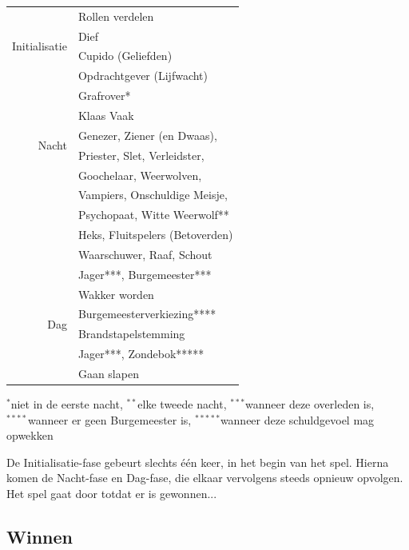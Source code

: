 \documentclass[12pt]{article}
\begin{document}
    \begin{center}
      \begin{tabular}{r|l}
	\multirow{4}{*}{Initialisatie} & Rollen verdelen \\ \cline{2-2}
	 & Dief \\ \cline{2-2}
	 & Cupido (Geliefden) \\ \cline{2-2}
	 & Opdrachtgever (Lijfwacht) \\
	\hline
	\hline
	\multirow{6}{*}{Nacht} & Grafrover* \\ \cline{2-2}
	 & Klaas Vaak \\ \cline{2-2}
	 & Genezer, Ziener (en Dwaas), \\
	 & Priester, Slet, Verleidster, \\
	 & Goochelaar, Weerwolven, \\
	 & Vampiers, Onschuldige Meisje, \\
	 & Psychopaat, Witte Weerwolf** \\ \cline{2-2}
	 & Heks, Fluitspelers (Betoverden)\\ \cline{2-2}
	 & Waarschuwer, Raaf, Schout \\ \cline{2-2}
	 & Jager***, Burgemeester*** \\
	\hline
	\multirow{4}{*}{Dag} & Wakker worden \\ \cline{2-2}
	 & Burgemeesterverkiezing**** \\ \cline{2-2}
	 & Brandstapelstemming \\ \cline{2-2}
	 & Jager***, Zondebok***** \\ \cline{2-2}
	 & Gaan slapen \\
      \end{tabular}
      
      {\scriptsize \noindent $^{\ast}$niet in de eerste nacht, 
      $^{\ast\ast}$elke tweede nacht, 
      $^{\ast\ast\ast}$wanneer deze overleden is, \\
      $^{\ast\ast\ast\ast}$wanneer er geen Burgemeester is,
      $^{\ast\ast\ast\ast\ast}$wanneer deze schuldgevoel mag opwekken}
      
    \end{center}
    
    De Initialisatie-fase gebeurt slechts \'e\'en keer, in het begin van het spel. Hierna komen de Nacht-fase en Dag-fase, die elkaar vervolgens steeds opnieuw opvolgen. Het spel gaat door totdat er is gewonnen...
    
  \subsection{Winnen} \label{subsec:winnen}
  
\end{document}
